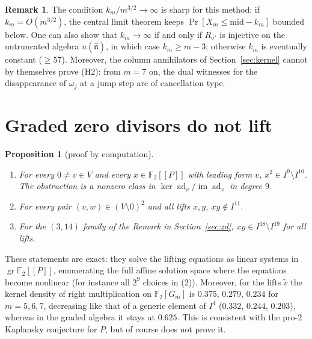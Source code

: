 \documentclass[11pt]{amsart}
\newtheorem{proposition}[theorem]{Proposition}
\theoremstyle{definition}
\newtheorem{remark}[theorem]{Remark}
\newcommand{\F}{\mathbb{F}}
\newcommand{\gr}{\operatorname{gr}}
\newcommand{\ad}{\operatorname{ad}}
\newcommand{\hatn}{\widehat{\mathfrak n}}
\begin{document}
\begin{remark}
The condition $k_m/m^{3/2}\to\infty$ is sharp for this method: if $k_m=O(m^{3/2})$, the central limit theorem keeps
$\Pr[X_m\le\mathrm{mid}-k_m]$ bounded below. One can also show that $k_m\to\infty$ if and only if $R_{\sigma'}$ is
injective on the untruncated algebra $u(\hatn)$, in which case $k_m\ge m-3$; otherwise $k_m$ is eventually constant
($\ge57$). Moreover, the column annihilators of Section~\ref{sec:kernel} cannot by themselves prove (H2): from $m=7$ on,
the dual witnesses for the disappearance of $\omega_j$ at a jump step are of cancellation type.
\end{remark}

\section{Graded zero divisors do not lift}\label{sec:lift}

\begin{proposition}[proof by computation]\label{prop:lift}
\begin{enumerate}
\item For every $0\ne v\in V$ and every $x\in\F_2[[P]]$ with leading form $v$, $x^2\in I^9\setminus I^{10}$.
The obstruction is a nonzero class in $\ker\ad_v/\operatorname{im}\ad_v$ in degree $9$.
\item For every pair $(v,w)\in(V\setminus0)^2$ and all lifts $x,y$, $xy\notin I^{11}$.
\item For the $(3,14)$ family of the Remark in Section~\ref{sec:zd}, $xy\in I^{18}\setminus I^{19}$ for all lifts.
\end{enumerate}
\end{proposition}

These statements are exact: they solve the lifting equations as linear systems in $\gr\F_2[[P]]$, enumerating the
full affine solution space where the equations become nonlinear (for instance all $2^9$ choices in (2)). Moreover,
for the lifts $\tilde v$ the kernel density of right multiplication on $\F_2[G_m]$ is $0.375$, $0.279$, $0.234$
for $m=5,6,7$, decreasing like that of a generic element of $I^4$ ($0.332$, $0.244$, $0.203$), whereas in the
graded algebra it stays at $0.625$.
This is consistent with the pro-2 Kaplansky conjecture for $P$, but of course does not prove it.

\end{document}
